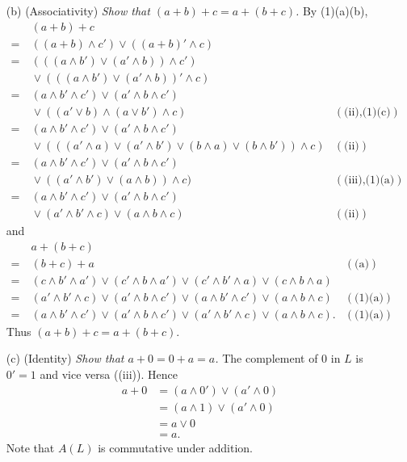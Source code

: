 \documentclass{article}
\begin{document}
\begin{enumerate}
\begin{enumerate}
  \item[(b)]
    (Associativity)
    \emph{Show that $(a + b) + c = a + (b + c)$.}
    By (1)(a)(b),
    \begin{align*}
      & \: (a + b) + c \\
      =& \: ((a + b) \wedge c') \vee ((a + b)' \wedge c) \\
      =& \: (((a \wedge b') \vee (a' \wedge b)) \wedge c') \\
          & \: \vee (((a \wedge b') \vee (a' \wedge b))' \wedge c) \\
      =& \: (a \wedge b' \wedge c') \vee (a' \wedge b \wedge c') \\
          & \: \vee ((a' \vee b) \wedge (a \vee b') \wedge c)
        &(\text{(ii),(1)(c)}) \\
      =& \: (a \wedge b' \wedge c') \vee (a' \wedge b \wedge c') \\
          & \: \vee
          (((a' \wedge a) \vee (a' \wedge b') \vee (b \wedge a) \vee (b \wedge b')) \wedge c)
        &(\text{(ii)}) \\
      =& \: (a \wedge b' \wedge c') \vee (a' \wedge b \wedge c') \\
          & \: \vee ((a' \wedge b') \vee (a \wedge b)) \wedge c)
        &(\text{(iii),(1)(a)}) \\
      =& \: (a \wedge b' \wedge c') \vee (a' \wedge b \wedge c') \\
          & \: \vee (a' \wedge b' \wedge c) \vee (a \wedge b \wedge c)
        &(\text{(ii)})
    \end{align*}
    and
    \begin{align*}
      & \: a + (b + c) \\
      =& \: (b + c) + a 
        &(\text{(a)}) \\
      =& \: (c \wedge b' \wedge a') \vee (c' \wedge b \wedge a')
        \vee (c' \wedge b' \wedge a) \vee (c \wedge b \wedge a) \\
      =& \: (a' \wedge b' \wedge c) \vee (a' \wedge b \wedge c')
        \vee (a \wedge b' \wedge c') \vee (a \wedge b \wedge c)
        &(\text{(1)(a)}) \\
      =& \: (a \wedge b' \wedge c') \vee (a' \wedge b \wedge c')
        \vee (a' \wedge b' \wedge c) \vee (a \wedge b \wedge c).
         &(\text{(1)(a)})
    \end{align*}
    Thus $(a + b) + c = a + (b + c)$.

  \item[(c)]
    (Identity)
    \emph{Show that $a + 0 = 0 + a = a$.}
    The complement of $0$ in $L$ is $0' = 1$ and vice versa ((iii)).
    Hence
    \begin{align*}
      a + 0
      &= (a \wedge 0') \vee (a' \wedge 0) \\
      &= (a \wedge 1) \vee (a' \wedge 0) \\
      &= a \vee 0 \\
      &= a.
    \end{align*}
    Note that $A(L)$ is commutative under addition.


\end{enumerate}
\end{enumerate}
\end{document}
